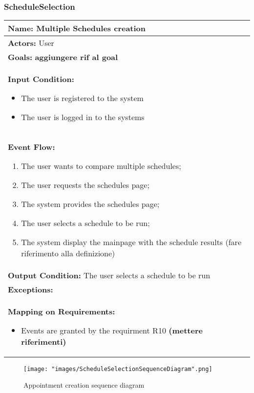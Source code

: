 \subsubsection{ScheduleSelection}
\begin{longtable}{|p{14cm}|} \hline
\textbf{Name:} Multiple Schedules creation \\ \hline
\textbf{Actors:} User \\ \hline
\textbf{Goals:} \textbf{aggiungere rif al goal} \\ \hline
\textbf{Input Condition:} 
\begin{itemize}
\item The user is registered to the system 
\item The user is logged in to the systems 
\end{itemize}
\\ \hline
\textbf{Event Flow:}
\begin{enumerate}
\item The user wants to compare multiple schedules;
\item The user requests the schedules page;
\item The system provides the schedules page;
\item The user selects a schedule to be run;
\item The system display the mainpage with the schedule results (fare riferimento alla definizione)
\end{enumerate}	\\ \hline
\textbf{Output Condition:} The user selects a schedule to be run \\ \hline
\textbf{Exceptions:}
\\ \hline
\textbf{Mapping on Requirements:}
\begin{itemize}
\item Events are granted by the requirment R10 \textbf{(mettere riferimenti)}
\end{itemize}  \\ \hline

\end{longtable}
\label{usecase:ScheduleSelection}

\begin{figure}[H]
\begin{center}
\texttt{[image: "images/ScheduleSelectionSequenceDiagram".png]}
\caption{Appointment creation sequence diagram}
\label{img:ScheduleSelection}
\end{center}
\end{figure}

